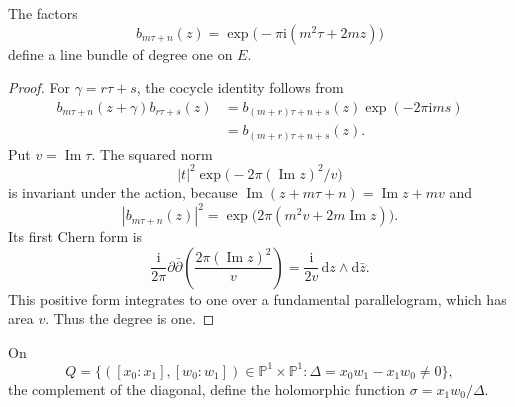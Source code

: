 \begin{example}\label{ex:positive-elliptic-automorphy}
The factors
\[
 b_{m\tau+n}(z)=\exp\bigl(-\pi\mathrm{i}(m^2\tau+2mz)\bigr)
\]
define a line bundle of degree one on $E$.
\end{example}
\begin{proof}
For $\gamma=r\tau+s$, the cocycle identity follows from
\[
 \begin{aligned}
 b_{m\tau+n}(z+\gamma)b_{r\tau+s}(z)
       &=b_{(m+r)\tau+n+s}(z)\exp(-2\pi\mathrm{i}ms)\\
       &=b_{(m+r)\tau+n+s}(z).
 \end{aligned}
\]
Put $v=\operatorname{Im}\tau$. The squared norm
\[
 |t|^2\exp\bigl(-2\pi(\operatorname{Im}z)^2/v\bigr)
\]
is invariant under the action, because $\operatorname{Im}(z+m\tau+n)=\operatorname{Im}z+mv$ and
\[
 |b_{m\tau+n}(z)|^2=\exp\bigl(2\pi(m^2v+2m\operatorname{Im}z)\bigr).
\]
Its first Chern form is
\[
 \frac{\mathrm{i}}{2\pi}\partial\bar\partial
              \left(\frac{2\pi(\operatorname{Im}z)^2}{v}\right)
       =\frac{\mathrm{i}}{2v}\,\mathrm{d}z\wedge\mathrm{d}\bar z.
\]
This positive form integrates to one over a fundamental parallelogram, which has area $v$. Thus the degree is one.
\end{proof}

On
\[
 Q=\{([x_0:x_1],[w_0:w_1])\in\mathbb P^1\times\mathbb P^1:
                    \Delta=x_0w_1-x_1w_0\ne0\},
\]
the complement of the diagonal, define the holomorphic function $\sigma=x_1w_0/\Delta$.

